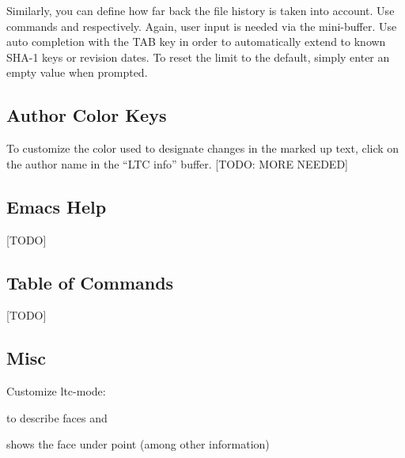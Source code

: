 Similarly, you can define how far back the file history is taken into account.  Use commands  
and  respectively.  Again, user input is needed via the mini-buffer.  Use auto completion with the TAB key in order to automatically extend to known SHA-1 keys or revision dates.  To reset the limit to the default, simply enter an empty value when prompted.

\subsection{Author Color Keys}

To customize the color used to designate changes in the marked up text, click on the author name in the ``LTC info'' buffer. [TODO: MORE NEEDED]

\subsection{Emacs Help}

[TODO]

\subsection{Table of Commands}

[TODO]

\subsection{Misc}

Customize ltc-mode: 

 to describe faces  and 

 shows the face under point (among other information)
